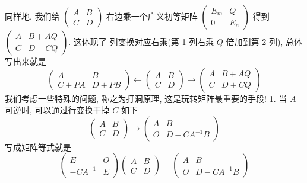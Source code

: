\documentclass{article}
\begin{document}
同样地, 我们给 $\left(\begin{array}{cc}A & B \\ C & D\end{array}\right)$ 右边乘一个广义初等矩阵 $\left(\begin{array}{cc}E_{m} & Q \\ 0 & E_{n}\end{array}\right)$ 得到 $\left(\begin{array}{cc}A & B+A Q \\ C & D+C Q\end{array}\right) .$ 这体现了
列变换对应右乘(第 1 列右乘 $Q$ 倍加到第 2 列), 总体写出来就是
\begin{equation*}
    \left(\begin{array}{cc}
        A     & B     \\
        C+P A & D+P B
    \end{array}\right) \leftarrow\left(\begin{array}{cc}
        A & B \\
        C & D
    \end{array}\right) \longrightarrow\left(\begin{array}{cc}
        A & B+A Q \\
        C & D+C Q
    \end{array}\right)
\end{equation*}
我们考虑一些特殊的问题, 称之为打洞原理, 这是玩转矩阵{\heiti 最重要}的手段!
1. 当 $A$ 可逆时, 可以通过行变换干掉 $C$ 如下
\begin{equation*}
    \left(\begin{array}{ll}
        A & B \\
        C & D
    \end{array}\right) \longrightarrow\left(\begin{array}{cc}
        A & B            \\
        O & D-C A^{-1} B
    \end{array}\right)
\end{equation*}
写成矩阵等式就是
\begin{equation*}
    \left(\begin{array}{cc}
        E         & O \\
        -C A^{-1} & E
    \end{array}\right)\left(\begin{array}{cc}
        A & B \\
        C & D
    \end{array}\right)=\left(\begin{array}{cc}
        A & B            \\
        O & D-C A^{-1} B
    \end{array}\right)
\end{equation*}
\end{document}
